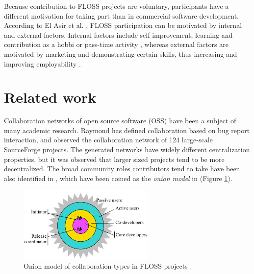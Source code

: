 Because contribution to FLOSS projects are voluntary, participants have a different motivation for taking part than in commercial software development. According to El Asir et al. \cite{elasriPeripheryCoreTemporal2017}, FLOSS participation can be motivated by internal and external factors. Internal factors include self-improvement, learning and contribution as a hobbi or pass-time activity  \cite{alexanderharsWorkingFreeMotivations2002,yunwenyeUnderstandingMotivationOpen2003}, whereas external factors are motivated by marketing and demonstrating certain skills, thus increasing and improving employability \cite{alexanderharsWorkingFreeMotivations2002}. \\

\section{Related work}

Collaboration networks of open source software (OSS) have been a subject of many academic research. Raymond \cite{crowstonSocialStructureFree2005} has defined collaboration based on bug report interaction, and observed the collaboration network of 124 large-scale SourceForge projects. The generated networks have widely different centralization properties, but it was observed that larger sized projects tend to be more decentralized. The broad community roles contributors tend to take have been also identified in \cite{crowstonSocialStructureFree2005}, which have been coined as the \textit{onion model} in \cite{martinez-romoUsingSocialNetwork2008} (Figure \ref{fig:onion1}). \\

\begin{figure}
    \centering
    \includegraphics[width=0.6\textwidth]{figures/onion_model.png}
    \caption{Onion model of collaboration types in FLOSS projects \cite{crowstonSocialStructureFree2005}.}
    \label{fig:onion1}
\end{figure}

